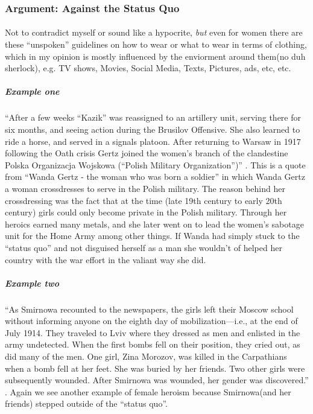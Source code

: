 \subsubsection{Argument: Against the Status Quo}
\paragraph{}
Not to contradict myself or sound like a hypocrite, \textit{but} even for women
there are these ``unspoken'' guidelines on how to wear or what to wear in terms
of clothing, which in my opinion is mostly influenced by the enviorment around
them(no duh sherlock), e.g. TV shows, Movies, Social Media, Texts, Pictures,
ads, etc, etc.
\par

\subparagraph{Example one}
``After a few weeks ``Kazik'' was reassigned to an artillery unit, serving
there for six months, and seeing action during the Brusilov Offensive. She also
learned to ride a horse, and served in a signals platoon. After returning to
Warsaw in 1917 following the Oath crisis Gertz joined the women's branch of the
clandestine Polska Organizacja Wojskowa (``Polish Military Organization'')''
\cite{TWBS}. This is a quote from ``Wanda Gertz - the woman who was born a
soldier'' in which Wanda Gertz a woman crossdresses to serve in the Polish
military. The reason behind her crossdressing was the fact that at the time
(late 19th century to early 20th century) girls could only become private in the
Polish military. Through her heroics earned many metals, and she later went on
to lead the women's sabotage unit for the Home Army among other things. If Wanda
had simply stuck to the ``status quo'' and not disguised herself as a man she
wouldn't of helped her country with the war effort in the valiant way she did.
\par
\newpage

\subparagraph{Example two} ``As Smirnowa recounted to the newspapers, the girls
left their Moscow school without informing anyone on the eighth day of
mobilization---i.e., at the end of July 1914. They traveled to Lviv where they
dressed as men and enlisted in the army undetected. When the first bombs fell on
their position, they cried out, as did many of the men. One girl, Zina Morozov,
was killed in the Carpathians when a bomb fell at her feet. She was buried by
her friends. Two other girls were subsequently wounded. After Smirnowa was
wounded, her gender was discovered.'' \cite[p.~365-67]{YGFRF}. Again we see
another example of female heroism because Smirnowa(and her friends) stepped
outside of the ``status quo''.
\par

